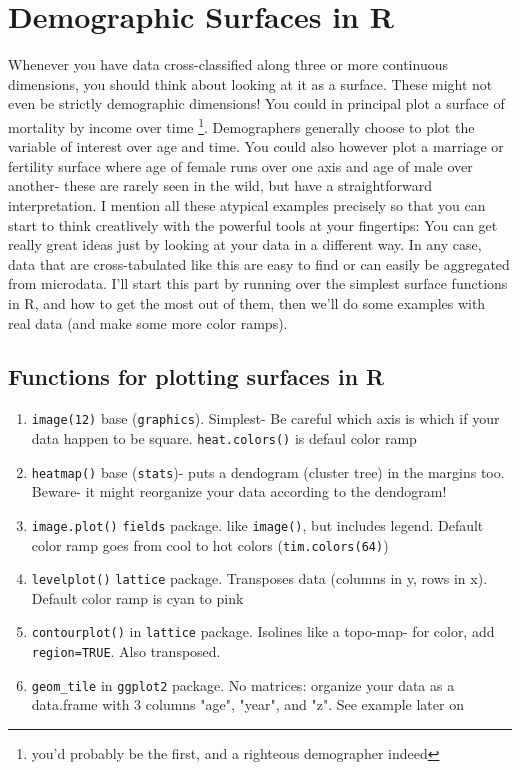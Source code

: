 % 
\section{Demographic Surfaces in R}
Whenever you have data cross-classified along three or more continuous dimensions, you should think about looking at it as a surface. These might not even be strictly demographic dimensions! You could in principal plot a surface of mortality by income over time \footnote{you'd probably be the first, and a righteous demographer indeed}. Demographers generally choose to plot the variable of interest over age and time. You could also however plot a marriage or fertility surface where age of female runs over one axis and age of male over another- these are rarely seen in the wild, but have a straightforward interpretation. I mention all these atypical examples precisely so that you can start to think creatlively with the powerful tools at your fingertips: You can get really great ideas just by looking at your data in a different way. In any case, data that are cross-tabulated like this are easy to find or can easily be aggregated from microdata.  I'll start this part by running over the simplest surface functions in R, and how to get the most out of them, then we'll do some examples with real data (and make some more color ramps).

\subsection{Functions for plotting surfaces in R}

\begin{enumerate}
\item{\texttt{image(12)}} base (\texttt{graphics}). Simplest- Be careful which axis is which if your data happen to be square. \texttt{heat.colors()} is defaul color ramp
\item{\texttt{heatmap()}} base (\texttt{stats})- puts a dendogram (cluster tree) in the margins too. Beware- it might reorganize your data according to the dendogram!
\item{\texttt{image.plot()}} \texttt{fields} package. like \texttt{image()}, but includes legend. Default color ramp goes from cool to hot colors (\texttt{tim.colors(64)})
\item{\texttt{levelplot()}} \texttt{lattice} package. Transposes data (columns in y, rows in x). Default color ramp is cyan to pink
\item{\texttt{contourplot()}} in \texttt{lattice} package. Isolines like a topo-map- for color, add \texttt{region=TRUE}. Also transposed.
\item{\texttt{geom_tile}} in \texttt{ggplot2} package. No matrices: organize your data as a data.frame with 3 columns "age", "year", and "z". See example later on
\end{enumerate}
